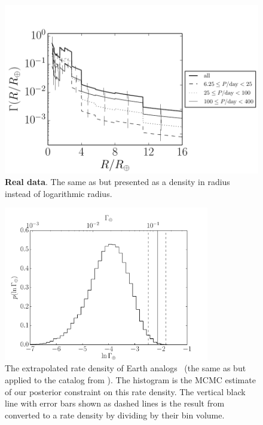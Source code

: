 \begin{figure}[p]
\begin{center}
\includegraphics{figures/exopop/results/linear-radius.pdf}
\end{center}
\caption{%
{\bf Real data}.
The same as  but presented as a density in radius instead of
logarithmic radius.
}
\end{figure}

\begin{figure}[p]
\begin{center}
\includegraphics[width=0.8\textwidth]{figures/exopop/results/rate.pdf}
\end{center}
\caption{%
The extrapolated rate density of Earth analogs \gammaearth\ (the same as
 but applied to the catalog from \citealt{Petigura:2013}).
The histogram is the MCMC estimate of our posterior constraint on this rate
density.
The vertical black line with error bars shown as dashed lines is the result
from \citet{Petigura:2013} converted to a rate density by dividing by their bin
volume.
}
\end{figure}

